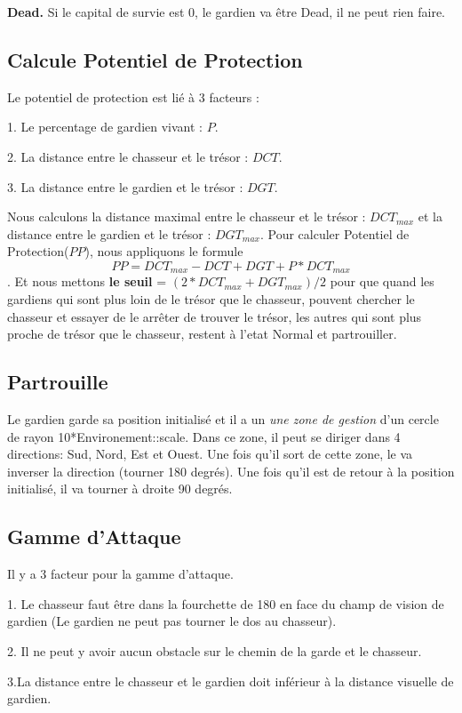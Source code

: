 \documentclass{article}
\begin{document}
\textbf{Dead.} Si le capital de survie est 0, le gardien va être Dead, il ne peut rien faire.

\subsection{Calcule Potentiel de Protection}
\label{calculeprotection}
Le potentiel de protection est lié à 3 facteurs : 

1. Le percentage de gardien vivant : $P$. 

2. La distance entre le chasseur et le trésor : $DCT$. 

3. La distance entre le gardien et le trésor : $DGT$.

Nous calculons la distance maximal entre le chasseur et le trésor : $DCT_{max}$ et la distance entre le gardien et le trésor : $DGT_{max}$. Pour calculer Potentiel de Protection($PP$), nous appliquons le formule $$PP =DCT_{max}-DCT + DGT + P* DCT_{max}$$.  Et nous mettons \textbf{le seuil} \label{seuil}  = 
$(2*DCT_{max} + DGT_{max})/2$ pour que quand les gardiens qui sont plus loin de le trésor que le chasseur, pouvent chercher le chasseur et essayer de le arrêter de trouver le trésor, les autres qui sont plus proche de trésor que le chasseur, restent à l'etat Normal et partrouiller.

\subsection{Partrouille}
\label{Partrouille}
Le gardien garde sa position initialisé et il a un \textsl{une zone de gestion} d'un cercle de rayon 10*Environement::scale. Dans ce zone, il peut se diriger dans 4 directions: Sud, Nord, Est et Ouest. Une fois qu'il sort de cette zone, le va inverser la direction (tourner 180 degrés). Une fois qu'il est de retour à la position initialisé, il va tourner à droite 90 degrés.

\subsection{Gamme d'Attaque}
\label{gammeattaque}
Il y a 3 facteur pour la gamme d'attaque. 

1. Le chasseur faut être dans la fourchette de 180 en face du champ de vision de gardien (Le gardien ne peut pas tourner le dos au chasseur). 

2. Il ne peut y avoir aucun obstacle sur le chemin de la garde et le chasseur. 

3.La distance entre le chasseur et le gardien doit inférieur à la distance visuelle de gardien.
\end{document}
